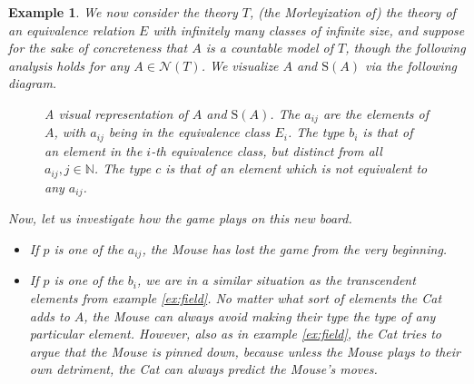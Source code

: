\documentclass{article}
\newtheorem{example}[theorem]{Example}
\theoremstyle{nonumberplain}
\newcommand{\N}{\mathbb{N}}
\newcommand{\calN}{\mathcal{N}}
\newcommand{\Stone}{\mathrm{S}}
\begin{document}
\begin{example}\label{ex:equiv}
We now consider the theory $T$, (the Morleyization of) the theory of an equivalence relation $E$ with infinitely many classes of infinite size, and suppose for the sake of concreteness that $A$ is a countable model of $T$, though the following analysis holds for any $A \in \calN(T)$. We visualize $A$ and $\Stone(A)$ via the following diagram.
\begin{figure}[H]
\centering
{}
\caption{A visual representation of $A$ and $\Stone(A)$. The $a_{ij}$ are the elements of $A$, with $a_{ij}$ being in the equivalence class $E_i$. The type $b_i$ is that of an element in the $i$-th equivalence class, but distinct from all $a_{ij}, j \in \N$. The type $c$ is that of an element which is not equivalent to any $a_{ij}$.}
\end{figure}

Now, let us investigate how the game plays on this new board.
\begin{itemize}
\item If $p$ is one of the $a_{ij}$, the Mouse has lost the game from the very beginning.

\item If $p$ is one of the $b_i$, we are in a similar situation as the transcendent elements from example \ref{ex:field}. No matter what sort of elements the Cat adds to $A$, the Mouse can always avoid making their type the type of any particular element. However, also as in example \ref{ex:field}, the Cat tries to argue that the Mouse is pinned down, because unless the Mouse plays to their own detriment, the Cat can always predict the Mouse's moves.


\end{itemize}
\end{example}
\end{document}
